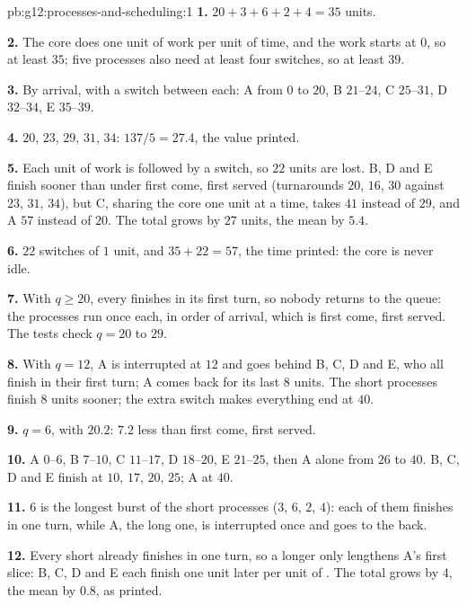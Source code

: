 \begin{solution}{pb:g12:processes-and-scheduling:1}
\textbf{1.} $20 + 3 + 6 + 2 + 4 = 35$ units.

\textbf{2.} The core does one unit of work per unit of time, and the work starts at $0$, so at least $35$; five
processes also need at least four switches, so at least $39$.

\textbf{3.} By arrival, with a switch between each: A from $0$ to $20$, B $21$--$24$, C $25$--$31$, D $32$--$34$,
E $35$--$39$.

\textbf{4.} $20$, $23$, $29$, $31$, $34$: $137 / 5 = 27.4$, the value printed.

\textbf{5.} Each unit of work is followed by a switch, so $22$ units are lost. B, D and E finish sooner than under
first come, first served (turnarounds $20$, $16$, $30$ against $23$, $31$, $34$), but C, sharing the core one unit at
a time, takes $41$ instead of $29$, and A $57$ instead of $20$. The total grows by $27$ units, the mean by $5.4$.

\textbf{6.} $22$ switches of $1$ unit, and $35 + 22 = 57$, the time printed: the core is never idle.

\textbf{7.} With $q \ge 20$, every  finishes in its first turn, so nobody returns to the queue: the processes
run once each, in order of arrival, which is first come, first served. The tests check $q = 20$ to $29$.

\textbf{8.} With $q = 12$, A is interrupted at $12$ and goes behind B, C, D and E, who all finish in their first turn;
A comes back for its last $8$ units. The short processes finish $8$ units sooner; the extra switch makes everything
end at $40$.

\textbf{9.} $q = 6$, with $20.2$: $7.2$ less than first come, first served.

\textbf{10.} A $0$--$6$, B $7$--$10$, C $11$--$17$, D $18$--$20$, E $21$--$25$, then A alone from $26$ to $40$. B, C, D
and E finish at $10$, $17$, $20$, $25$; A at $40$.

\textbf{11.} $6$ is the longest burst of the short processes ($3$, $6$, $2$, $4$): each of them finishes in one turn,
while A, the long one, is interrupted once and goes to the back.

\textbf{12.} Every short  already finishes in one turn, so a longer  only lengthens A's first slice:
B, C, D and E each finish one unit later per unit of . The total grows by $4$, the mean by $0.8$, as printed.


\end{solution}
